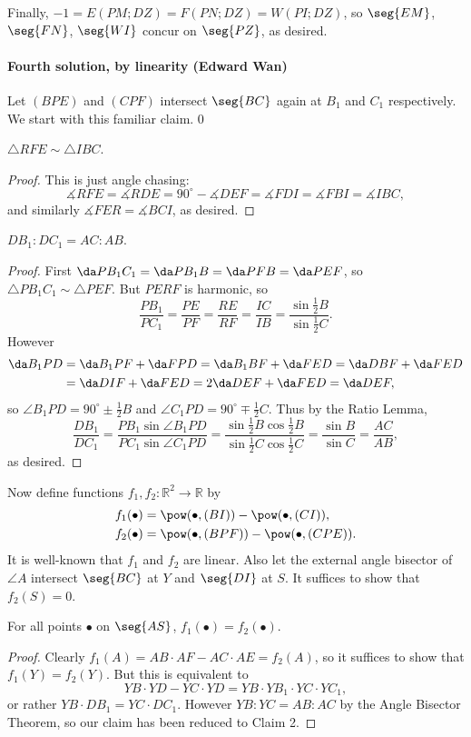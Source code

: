 Finally, $-1=E(PM;DZ)=F(PN;DZ)=W(PI;DZ)$, so $\seg{EM}$, $\seg{FN}$, $\seg{WI}$ concur on $\seg{PZ}$, as desired.

\paragraph{Fourth solution, by linearity (Edward Wan)}     Let $(BPE)$ and $(CPF)$ intersect $\seg{BC}$ again at $B_1$ and $C_1$ respectively. We start with this familiar claim.
\setcounter{claim}0
\begin{claim}
    $\triangle RFE\sim\triangle IBC$.
\end{claim}
\begin{proof}
    This is just angle chasing: \[\measuredangle RFE=\measuredangle RDE=90^\circ-\measuredangle DEF=\measuredangle FDI=\measuredangle FBI=\measuredangle IBC,\]
    and similarly $\measuredangle FER=\measuredangle BCI$, as desired.
\end{proof}
\begin{claim}
    $DB_1:DC_1=AC:AB$.
\end{claim}
\begin{proof}
    First $\da PB_1C_1=\da PB_1B=\da PFB=\da PEF$, so $\triangle PB_1C_1\sim\triangle PEF$. But $PERF$ is harmonic, so \[\frac{PB_1}{PC_1}=\frac{PE}{PF}=\frac{RE}{RF}=\frac{IC}{IB}=\frac{\sin\tfrac12B}{\sin\tfrac12C}.\]
    However
    \begin{align*}
        \da B_1PD&=\da B_1PF+\da FPD=\da B_1BF+\da FED=\da DBF+\da FED\\\ &=\da DIF+\da FED=2\da DEF+\da FED=\da DEF,
    \end{align*}
    so $\angle B_1PD=90^\circ\pm\tfrac12B$ and $\angle C_1PD=90^\circ\mp\tfrac12C$. Thus by the Ratio Lemma, \[\frac{DB_1}{DC_1}=\frac{PB_1\sin\angle B_1PD}{PC_1\sin\angle C_1PD}=\frac{\sin\tfrac12B\cos\tfrac12B}{\sin\tfrac12C\cos\tfrac12C}=\frac{\sin B}{\sin C}=\frac{AC}{AB},\]
    as desired.
\end{proof}

Now define functions $f_1,f_2:\mathbb R^2\to\mathbb R$ by
\begin{align*}
    f_1(\bullet)&=\pow(\bullet,(BI))-\pow(\bullet,(CI)),\\
    f_2(\bullet)&=\pow(\bullet,(BPF))-\pow(\bullet,(CPE)).
\end{align*}
It is well-known that $f_1$ and $f_2$ are linear. Also let the external angle bisector of $\angle A$ intersect $\seg{BC}$ at $Y$ and $\seg{DI}$ at $S$. It suffices to show that $f_2(S)=0$.
\begin{claim}
    For all points $\bullet$ on $\seg{AS}$, $f_1(\bullet)=f_2(\bullet)$.
\end{claim}
\begin{proof}
    Clearly $f_1(A)=AB\cdot AF-AC\cdot AE=f_2(A)$, so it suffices to show that $f_1(Y)=f_2(Y)$. But this is equivalent to \[YB\cdot YD-YC\cdot YD=YB\cdot YB_1\cdot YC\cdot YC_1,\]
    or rather $YB\cdot DB_1=YC\cdot DC_1$. However $YB:YC=AB:AC$ by the Angle Bisector Theorem, so our claim has been reduced to Claim 2.
\end{proof}


